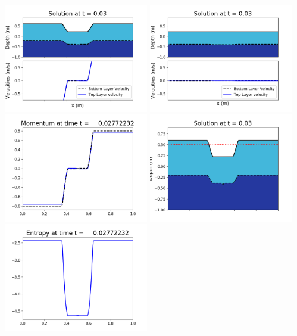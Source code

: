 \documentclass[11pt]{article}
\begin{document}
\vskip 10pt 
\includegraphics[width=0.475\textwidth]{frame0077fig1001.png}
\includegraphics[width=0.475\textwidth]{frame0077fig1002.png}
\vskip 10pt 
\includegraphics[width=0.475\textwidth]{frame0077fig1003.png}
\includegraphics[width=0.475\textwidth]{frame0077fig1006.png}
\vskip 10pt 
\includegraphics[width=0.475\textwidth]{frame0077fig1007.png}
\end{document}

